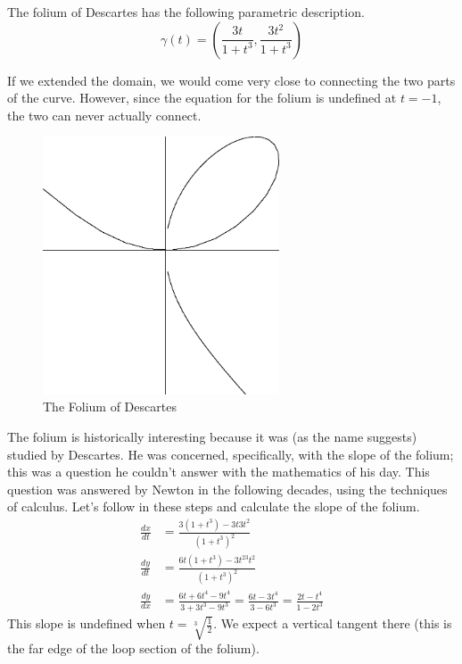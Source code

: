 \documentclass[fleqn]{report}
\begin{document}
\begin{example}
The folium of Descartes has the following parametric
description. 
\begin{equation*}
\gamma(t) = \left( \frac{3t}{1+t^3},\frac{3t^2}{1+t^3} \right) 
\end{equation*}

If we extended the domain, we would come very close to
connecting the two parts of the curve. However, since the
equation for the folium is undefined at $t=-1$, the two can
never actually connect.

\begin{figure}[t]
\centering
\includegraphics[width=7cm]{figure17.eps}
\caption{The Folium of Descartes}
\label{figure-folium}
\end{figure}

The folium is historically interesting because it was (as the
name suggests) studied by Descartes. He was concerned,
specifically, with the slope of the folium; this was a
question he couldn't answer with the mathematics of his day.
This question was answered by Newton in the following decades,
using the techniques of calculus. Let's follow in these steps
and calculate the slope of the folium.
\begin{align*}
\frac{dx}{dt} & = \frac{3(1+t^3) - 3t3t^2}{(1+t^3)^2} \\
\frac{dy}{dt} & = \frac{6t(1+t^3) - 3t^23t^2}{(1+t^3)^2} \\
\frac{dy}{dx} & = \frac{6t + 6t^4 - 9t^4}{3 + 3t^3 -
9t^3} = \frac{6t-3t^4}{3-6t^3} = \frac{2t-t^4}{1-2t^3}
\end{align*}
This slope is undefined when $t = \sqrt[3]{\frac{1}{2}}$. We
expect a vertical tangent there (this is the far edge of the
loop section of the folium).
\end{example}
\end{document}
